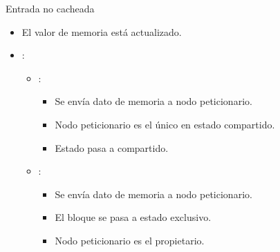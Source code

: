 \begin{frame}[t]{Entrada no cacheada}
\begin{itemize}
  \item El valor de memoria está actualizado.

  \item {}:
    \begin{itemize}
      \item {}:
        \begin{itemize}
          \item Se envía dato de memoria a nodo peticionario.
          \item Nodo peticionario es el único en estado compartido.
          \item Estado pasa a compartido.
        \end{itemize}
      \item {}:
        \begin{itemize}
          \item Se envía dato de memoria a nodo peticionario.
          \item El bloque se pasa a estado exclusivo.
          \item Nodo peticionario es el propietario.
        \end{itemize}
    \end{itemize}
\end{itemize}
\end{frame}

